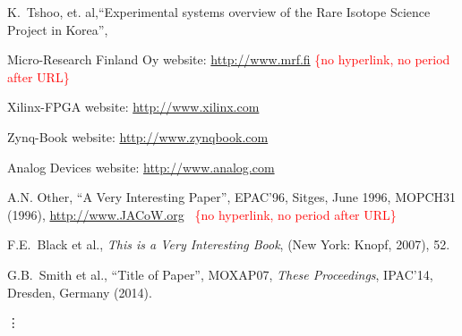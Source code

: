 \documentclass[a4paper,
              ]{jacow}
\begin{document}
\iffalse  %
	\printbibliography

\else

\begin{thebibliography}{9}   %

 K.~Tshoo,{ et. al},``Experimental systems overview of the Rare Isotope Science Project in Korea'',

	Micro-Research Finland Oy website:
	\url{http://www.mrf.fi}%
	\hfill\textcolor{red}{\{no hyperlink, no period after URL\}}


Xilinx-FPGA website:
\url{http://www.xilinx.com}

Zynq-Book website:
\url{http://www.zynqbook.com}


Analog Devices website:
\url{http://www.analog.com}

	A.N. Other,
	``A Very Interesting Paper'',
	EPAC'96, Sitges, June 1996, MOPCH31 (1996),
	\url{http://www.JACoW.org}\newline \mbox{ } \hfill\textcolor{red}{\{no hyperlink, no period after URL\}}

	F.E.~Black et al.,
	\textit{This is a Very Interesting Book},
	(New York: Knopf, 2007), 52.

    G.B.~Smith et al., ``Title of Paper'',
    MOXAP07, \textit{These Proceedings}, IPAC'14, Dresden, Germany (2014).

	\hspace*{-1.1em}\mbox{\vdots}


\end{thebibliography}

\fi
\end{document}
